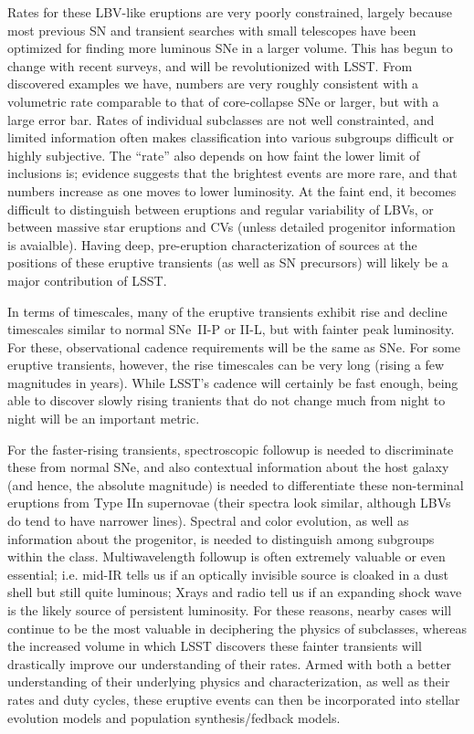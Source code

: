 Rates for these LBV-like eruptions are very poorly constrained,
largely because most previous SN and transient searches with small
telescopes have been optimized for finding more luminous SNe in a
larger volume.  This has begun to change with recent surveys, and will
be revolutionized with LSST.  From discovered examples we have,
numbers are very roughly consistent with a volumetric rate comparable
to that of core-collapse SNe or larger, but with a large error bar.
Rates of individual subclasses are not well constrainted, and limited
information often makes classification into various subgroups
difficult or highly subjective.  The ``rate'' also depends on how
faint the lower limit of inclusions is; evidence suggests that the
brightest events are more rare, and that numbers increase as one moves
to lower luminosity.  At the faint end, it becomes difficult to
distinguish between eruptions and regular variability of LBVs, or
between massive star eruptions and CVs (unless detailed progenitor
information is avaialble).  Having deep, pre-eruption characterization
of sources at the positions of these eruptive transients (as well as
SN precursors) will likely be a major contribution of LSST.

In terms of timescales, many of the eruptive transients exhibit rise
and decline timescales similar to normal SNe~II-P or II-L, but with
fainter peak luminosity.  For these, observational cadence
requirements will be the same as SNe.  For some eruptive transients,
however, the rise timescales can be very long (rising a few magnitudes
in years).  While LSST's cadence will certainly be fast enough, being
able to discover slowly rising tranients that do not change much from
night to night will be an important metric.

For the faster-rising transients, spectroscopic followup is needed to
discriminate these from normal SNe, and also contextual information
about the host galaxy (and hence, the absolute magnitude) is needed to
differentiate these non-terminal eruptions from Type IIn supernovae
(their spectra look similar, although LBVs do tend to have narrower
lines).  Spectral and color evolution, as well as information about
the progenitor, is needed to distinguish among subgroups within the
class.  Multiwavelength followup is often extremely valuable or even
essential; i.e. mid-IR tells us if an optically invisible source is
cloaked in a dust shell but still quite luminous; Xrays and radio tell
us if an expanding shock wave is the likely source of persistent
luminosity.  For these reasons, nearby cases will continue to be the
most valuable in deciphering the physics of subclasses, whereas the
increased volume in which LSST discovers these fainter transients will
drastically improve our understanding of their rates.  Armed with both
a better understanding of their underlying physics and
characterization, as well as their rates and duty cycles, these
eruptive events can then be incorporated into stellar evolution models
and population synthesis/fedback models.

